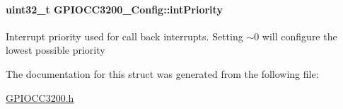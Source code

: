 \paragraph[{int\+Priority}]{\setlength{\rightskip}{0pt plus 5cm}uint32\+\_\+t G\+P\+I\+O\+C\+C3200\+\_\+\+Config\+::int\+Priority}\label{struct_g_p_i_o_c_c3200___config_a75035e2fbbae7a387c9af597c26b2d77}
Interrupt priority used for call back interrupts. Setting $\sim$0 will configure the lowest possible priority 

The documentation for this struct was generated from the following file\+:\begin{DoxyCompactItemize}
\item 
\hyperlink{_g_p_i_o_c_c3200_8h}{G\+P\+I\+O\+C\+C3200.\+h}\end{DoxyCompactItemize}
